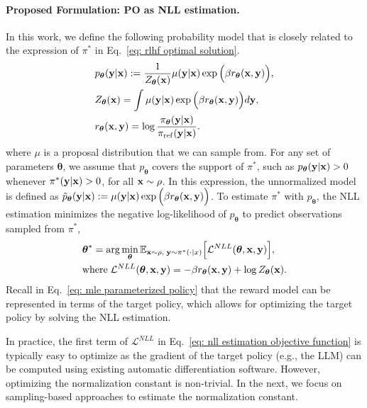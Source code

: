 \paragraph{Proposed Formulation: PO as NLL estimation.}
In this work,
we define the following probability model that is closely related to the expression of $\pi^{\ast}$ in Eq.~\eqref{eq: rlhf optimal solution}.
\begin{align}
\label{eq: mle parameterized policy}
& p_{\boldsymbol\theta}(\mathbf{y} | \mathbf{x})
: =
\frac{1} {Z_{\boldsymbol\theta}(\mathbf{x})}
\mu(\mathbf{y} | \mathbf{x}) 
\exp\Big(
\beta
r_{\boldsymbol\theta}(\mathbf{x}, \mathbf{y})
\Big),
\\ \nonumber
&
Z_{\boldsymbol\theta}(\mathbf{x})
=
\int
\mu(\mathbf{y} | \mathbf{x})
\exp 
\Big(
\beta
r_{\boldsymbol\theta}(\mathbf{x}, \mathbf{y})
\Big)
d\mathbf{y}
,
\\ \nonumber
&
r_{\boldsymbol\theta}(\mathbf{x}, \mathbf{y}) = \log \frac{\pi_{\boldsymbol\theta}(\mathbf{y} | \mathbf{x})} {\pi_{\rm ref}(\mathbf{y} | \mathbf{x})}.
\end{align}
where 
$\mu$ is a proposal distribution that we can sample from.
For any set of parameters $\boldsymbol\theta$,
we assume that $p_{\boldsymbol\theta}$ covers the support of $\pi^{\ast}$, such as $p_{\boldsymbol\theta}(\mathbf{y} | \mathbf{x}) > 0$ whenever $\pi^{\ast}(\mathbf{y} | \mathbf{x}) > 0$, for all $\mathbf{x} \sim \rho$. 
In this expression,
the unnormalized model is defined as 
$\tilde{p}_{\boldsymbol\theta}(\mathbf{y} | \mathbf{x})
:=
\mu(\mathbf{y} | \mathbf{x}) 
\exp\Big(
\beta
r_{\boldsymbol\theta}(\mathbf{x}, \mathbf{y})
\Big)$.
To estimate $\pi^{\ast}$ with $p_{\boldsymbol\theta}$,
the NLL estimation minimizes the negative log-likelihood of $p_{\boldsymbol\theta}$ to predict observations sampled from $\pi^{\ast}$,
\begin{align}
\label{eq: nll estimation objective function}
& \boldsymbol\theta^{\ast} = \arg \min \limits_{\boldsymbol\theta}
\mathbb{E}_{\mathbf{x} \sim \rho, \; \mathbf{y} \sim \pi^{\ast}(\cdot|x)}
\Big[
\mathcal{L}^{NLL}(\boldsymbol\theta, \mathbf{x}, \mathbf{y})
\Big],
\\ \nonumber
& {\rm where}\;
\mathcal{L}^{NLL}(\boldsymbol\theta, \mathbf{x}, \mathbf{y})
=
-
\beta
r_{\boldsymbol\theta}(\mathbf{x}, \mathbf{y})
+ \log Z_{\boldsymbol\theta}(\mathbf{x}).
\end{align}
Recall in Eq.~\eqref{eq: mle parameterized policy} that the reward model can be represented in terms of the target policy,
which allows for optimizing the target policy by solving the NLL estimation.


In practice,
the first term of $\mathcal{L}^{NLL}$ in Eq.~\eqref{eq: nll estimation objective function} is typically easy to optimize as the gradient of the target policy (e.g., the LLM) can be computed using existing automatic differentiation software.
However,
optimizing the normalization constant is non-trivial.
In the next,
we focus on sampling-based approaches to estimate the normalization constant.


